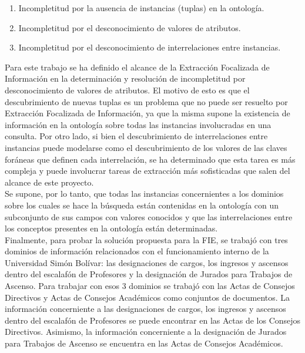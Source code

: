 \begin{enumerate}
\item Incompletitud por la ausencia de instancias (tuplas) en la ontología. 
\item Incompletitud por el desconocimiento de valores de atributos. 
\item Incompletitud por el desconocimiento de interrelaciones entre instancias.
\end{enumerate}

Para este trabajo se ha definido el alcance de la Extracción Focalizada de Información en la determinación y resolución de incompletitud por desconocimiento de valores de atributos. El motivo de esto es que el descubrimiento de nuevas tuplas es un problema que no puede ser resuelto por Extracción Focalizada de Información, ya que la misma supone la existencia de información en la ontología sobre todas las instancias involucradas en una consulta. Por otro lado, si bien el descubrimiento de interrelaciones entre instancias puede modelarse como el descubrimiento de los valores de las claves foráneas que definen cada interrelación, se ha determinado que esta tarea es más compleja y puede involucrar tareas de extracción más sofisticadas que salen del alcance de este proyecto.\\

Se supone, por lo tanto, que todas las instancias concernientes a los dominios sobre los cuales se hace la búsqueda están contenidas en la ontología con un subconjunto de sus campos con valores conocidos y que las interrelaciones entre los conceptos presentes en la ontología están determinadas.\\

Finalmente, para probar la solución propuesta para la FIE, se trabajó con tres dominios de información relacionados con el funcionamiento interno de la Universidad Simón Bolívar: las designaciones de cargos, los ingresos y ascensos dentro del escalafón de Profesores y la designación de Jurados para Trabajos de Ascenso. Para trabajar con esos 3 dominios se trabajó con las Actas de Consejos Directivos y Actas de Consejos Académicos como conjuntos de documentos. La información concerniente a las designaciones de cargos, los ingresos y ascensos dentro del escalafón de Profesores se puede encontrar en las Actas de los Consejos Directivos. Asimismo, la información concerniente a la designación de Jurados para Trabajos de Ascenso se encuentra en las Actas de Consejos 
Académicos. \\

